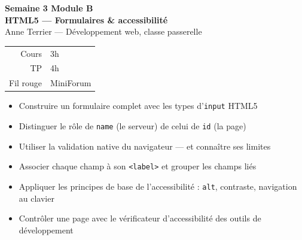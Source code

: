 \documentclass[a4paper,11pt]{article}
\begin{document}

\begin{tcolorbox}[
  colback=accentBlue, colframe=accentBlue,
  arc=4pt, left=12pt, right=12pt, top=10pt, bottom=10pt]
  \begin{minipage}{0.70\linewidth}
    {\color{cfptYellow}\Large\bfseries Semaine 3 \quad\textbar\quad Module B}\\[4pt]
    {\color{white}\Large\bfseries HTML5 --- Formulaires \& accessibilité}\\[4pt]
    {\color{lightBlue}\normalsize Anne Terrier --- Développement web, classe passerelle}
  \end{minipage}
  \hfill
  \begin{minipage}{0.24\linewidth}
    \raggedleft
    \begin{tabular}{rl}
      \color{lightBlue}\small Cours & \color{white}\small 3h \\
      \color{lightBlue}\small TP    & \color{white}\small 4h \\
      \color{lightBlue}\small Fil rouge & \color{white}\small MiniForum \\
    \end{tabular}
  \end{minipage}
\end{tcolorbox}

\vspace{6pt}
\begin{tcolorbox}[definition, title={Objectifs de la semaine}]
\begin{itemize}
  \item Construire un formulaire complet avec les types d'\texttt{input} HTML5
  \item Distinguer le rôle de \texttt{name} (le serveur) de celui de \texttt{id} (la page)
  \item Utiliser la validation native du navigateur --- et connaître ses limites
  \item Associer chaque champ à son \texttt{<label>} et grouper les champs liés
  \item Appliquer les principes de base de l'accessibilité : \texttt{alt}, contraste, navigation au clavier
  \item Contrôler une page avec le vérificateur d'accessibilité des outils de développement
\end{itemize}
\end{tcolorbox}
\end{document}
